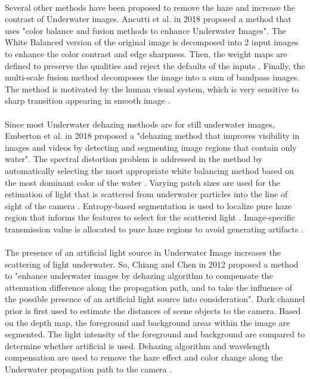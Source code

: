 \documentclass[a4paper,11pt,oneside]{article}
\begin{document}
  \\
  Several other methods have been proposed to remove the haze and increase the contrast of Underwater images. Ancutti et al. in 2018 \cite{16} proposed a method that uses "color balance and fusion methods to enhance Underwater Images". The White Balanced version of the original image is decomposed into 2 input images to enhance the color contrast and edge sharpness. Then, the weight maps are defined to preserve the qualities and reject the defaults of the inputs \cite{16}. Finally, the multi-scale fusion method decomposes the image into a sum of bandpass images. The method is motivated by the human visual system, which is very sensitive to sharp transition appearing in smooth image \cite{16}.\\
  \\
  Since most Underwater dehazing methods are for still underwater images, Emberton et al. \cite{2} in 2018 proposed a "dehazing method that improves visibility in images and videos by detecting and segmenting image regions that contain only water". The spectral distortion problem is addressed in the method by automatically selecting the most appropriate white balancing method based on the most dominant color of the water \cite{2}. Varying patch sizes are used for the estimation of light that is scattered from underwater particles into the line of sight of the camera \cite{2}. Entropy-based segmentation is used to localize pure haze region that informs the features to select for the scattered light \cite{2}. Image-specific transmission value is allocated to pure haze regions to avoid generating artifacts \cite{2}.\\
  \\
   The presence of an artificial light source in Underwater Image increases the scattering of light underwater. So, Chiang and Chen in 2012 \cite{13} proposed a method to "enhance underwater images by dehazing algorithm to compensate the attenuation difference along the propagation path, and to take the influence of the possible presence of an artificial light source into consideration". Dark channel prior is first used to estimate the distances of scene objects to the camera. Based on the depth map, the foreground and background areas within the image are segmented. The light intensity of the foreground and background are compared to determine whether artificial is used. Dehazing algorithm and wavelength compensation are used to remove the haze effect and color change along the Underwater propagation path to the camera \cite{13}.\\
\end{document}

